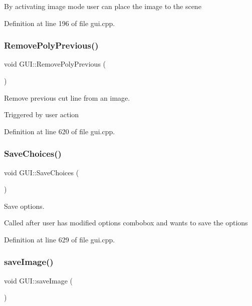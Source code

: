 By activating image mode user can place the image to the scene 

Definition at line 196 of file gui.\+cpp.

\mbox{\label{classGUI_abf8e1050ae4d599bf35af7b1f841d960}} 
\subsubsection{\texorpdfstring{Remove\+Poly\+Previous()}{RemovePolyPrevious()}}
{\footnotesize\ttfamily void G\+U\+I\+::\+Remove\+Poly\+Previous (\begin{DoxyParamCaption}{ }\end{DoxyParamCaption})}



Remove previous cut line from an image. 

Triggered by user action 

Definition at line 620 of file gui.\+cpp.

\mbox{\label{classGUI_a00fb847ea0a8249acaaf70c0f3ba3fd4}} 
\subsubsection{\texorpdfstring{Save\+Choices()}{SaveChoices()}}
{\footnotesize\ttfamily void G\+U\+I\+::\+Save\+Choices (\begin{DoxyParamCaption}{ }\end{DoxyParamCaption})}



Save options. 

Called after user has modified options combobox and wants to save the options 

Definition at line 629 of file gui.\+cpp.

\mbox{\label{classGUI_a44684af7706c021022520e2c4829c3ee}} 
\subsubsection{\texorpdfstring{save\+Image()}{saveImage()}}
{\footnotesize\ttfamily void G\+U\+I\+::save\+Image (\begin{DoxyParamCaption}{ }\end{DoxyParamCaption})}




